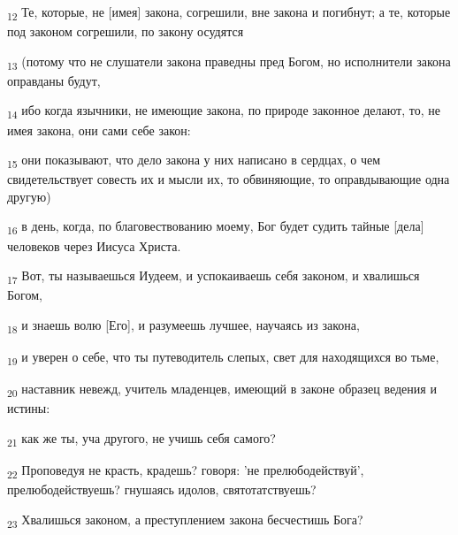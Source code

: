 \begin{tcolorbox}
\textsubscript{12} Те, которые, не [имея] закона, согрешили, вне закона и погибнут; а те, которые под законом согрешили, по закону осудятся
\end{tcolorbox}
\begin{tcolorbox}
\textsubscript{13} (потому что не слушатели закона праведны пред Богом, но исполнители закона оправданы будут,
\end{tcolorbox}
\begin{tcolorbox}
\textsubscript{14} ибо когда язычники, не имеющие закона, по природе законное делают, то, не имея закона, они сами себе закон:
\end{tcolorbox}
\begin{tcolorbox}
\textsubscript{15} они показывают, что дело закона у них написано в сердцах, о чем свидетельствует совесть их и мысли их, то обвиняющие, то оправдывающие одна другую)
\end{tcolorbox}
\begin{tcolorbox}
\textsubscript{16} в день, когда, по благовествованию моему, Бог будет судить тайные [дела] человеков через Иисуса Христа.
\end{tcolorbox}
\begin{tcolorbox}
\textsubscript{17} Вот, ты называешься Иудеем, и успокаиваешь себя законом, и хвалишься Богом,
\end{tcolorbox}
\begin{tcolorbox}
\textsubscript{18} и знаешь волю [Его], и разумеешь лучшее, научаясь из закона,
\end{tcolorbox}
\begin{tcolorbox}
\textsubscript{19} и уверен о себе, что ты путеводитель слепых, свет для находящихся во тьме,
\end{tcolorbox}
\begin{tcolorbox}
\textsubscript{20} наставник невежд, учитель младенцев, имеющий в законе образец ведения и истины:
\end{tcolorbox}
\begin{tcolorbox}
\textsubscript{21} как же ты, уча другого, не учишь себя самого?
\end{tcolorbox}
\begin{tcolorbox}
\textsubscript{22} Проповедуя не красть, крадешь? говоря: 'не прелюбодействуй', прелюбодействуешь? гнушаясь идолов, святотатствуешь?
\end{tcolorbox}
\begin{tcolorbox}
\textsubscript{23} Хвалишься законом, а преступлением закона бесчестишь Бога?
\end{tcolorbox}

